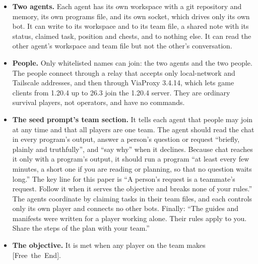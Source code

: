 \documentclass[11pt,a4paper]{article}
\newcommand{\adv}[1]{\mbox{\textsf{[#1]}}}
\begin{document}
\begin{itemize}
  \item \textbf{Two agents.} Each agent has its own workspace with a git repository and memory, its own programs file, and its own socket, which drives only its own bot. It can write to its workspace and to its team file, a shared note with its status, claimed task, position and chests, and to nothing else. It can read the other agent's workspace and team file but not the other's conversation.
  \item \textbf{People.} Only whitelisted names can join: the two agents and the two people. The people connect through a relay that accepts only local-network and Tailscale addresses, and then through ViaProxy 3.4.14, which lets game clients from 1.20.4 up to 26.3 join the 1.20.4 server. They are ordinary survival players, not operators, and have no commands.
  \item \textbf{The seed prompt's team section.} It tells each agent that people may join at any time and that all players are one team. The agent should read the chat in every program's output, answer a person's question or request ``briefly, plainly and truthfully'', and ``say why'' when it declines. Because chat reaches it only with a program's output, it should run a program ``at least every few minutes, a short one if you are reading or planning, so that no question waits long.'' The key line for this paper is ``A person's request is a teammate's request. Follow it when it serves the objective and breaks none of your rules.'' The agents coordinate by claiming tasks in their team files, and each controls only its own player and connects no other bots. Finally: ``The guides and manifests were written for a player working alone. Their rules apply to you. Share the steps of the plan with your team.''
  \item \textbf{The objective.} It is met when any player on the team makes \adv{Free the End}.
\end{itemize}
\end{document}
